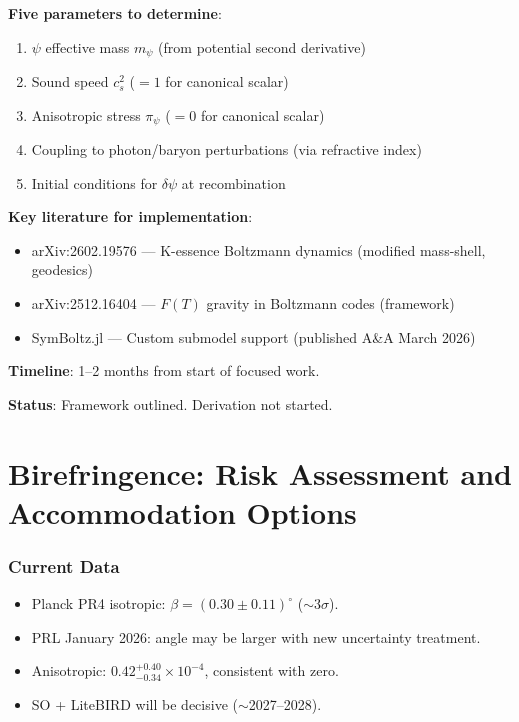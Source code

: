 \documentclass[11pt,a4paper]{article}
\begin{document}
\begin{tcolorbox}[colback=yellow!5!white, colframe=yellow!60!black,
  title={Phase 0B: $\psi$ Perturbation Theory --- Framework}]
\textbf{Five parameters to determine}:
\begin{enumerate}
\item $\psi$ effective mass $m_\psi$ (from potential second derivative)
\item Sound speed $c_s^2$ ($= 1$ for canonical scalar)
\item Anisotropic stress $\pi_\psi$ ($= 0$ for canonical scalar)
\item Coupling to photon/baryon perturbations (via refractive index)
\item Initial conditions for $\delta\psi$ at recombination
\end{enumerate}

\textbf{Key literature for implementation}:
\begin{itemize}
\item arXiv:2602.19576 --- K-essence Boltzmann dynamics (modified mass-shell, geodesics)
\item arXiv:2512.16404 --- $F(T)$ gravity in Boltzmann codes (framework)
\item SymBoltz.jl --- Custom submodel support (published A\&A March 2026)
\end{itemize}

\textbf{Timeline}: 1--2 months from start of focused work.

\textbf{Status}: Framework outlined. Derivation not started.
\end{tcolorbox}


\part{Birefringence: Risk Assessment and Accommodation Options}

\section{Current Data}

\begin{itemize}
\item Planck PR4 isotropic: $\beta = (0.30 \pm 0.11)^\circ$ ($\sim 3\sigma$).
\item PRL January 2026: angle may be larger with new uncertainty treatment.
\item Anisotropic: $0.42^{+0.40}_{-0.34} \times 10^{-4}$, consistent with zero.
\item SO + LiteBIRD will be decisive ($\sim$2027--2028).
\end{itemize}
\end{document}
